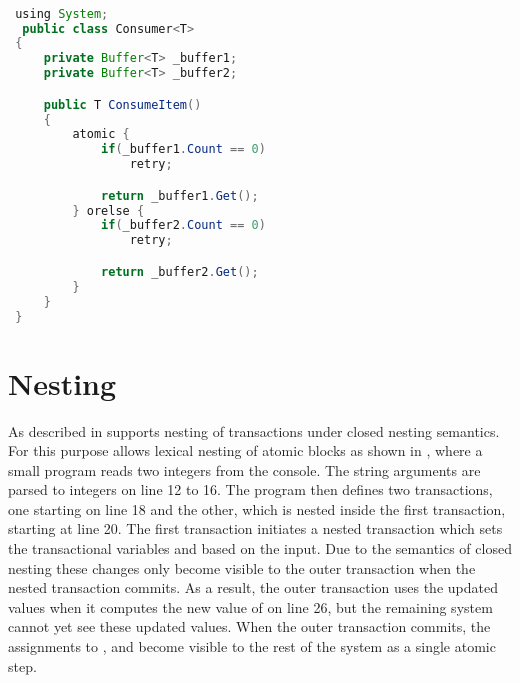 \begin{lstlisting}[label=lst:stm_atomic_syntax_orelse,
 caption={OrElse Syntax},
 language=Java, 
 showspaces=false,
 showtabs=false,
 breaklines=true,
 showstringspaces=false,
 breakatwhitespace=true,
 commentstyle=\color{greencomments},
 keywordstyle=\color{bluekeywords},
 stringstyle=\color{redstrings},
 morekeywords={atomic, retry, orelse, var, get, set, using}]  % Start your code-block

 using System;
  public class Consumer<T>
 {
     private Buffer<T> _buffer1;
     private Buffer<T> _buffer2;

     public T ConsumeItem()
     {
         atomic {
             if(_buffer1.Count == 0)
                 retry;

             return _buffer1.Get();
         } orelse {
             if(_buffer2.Count == 0)
                 retry;

             return _buffer2.Get();
         }
     }
 }
\end{lstlisting}

\section{Nesting}\label{sec:nesting_design}
As described in  \stmnamesp supports nesting of transactions under closed nesting semantics. For this purpose \stmnamesp allows lexical nesting of atomic blocks as shown in , where a small program reads two integers from the console. The string arguments are parsed to integers on line 12 to 16. The program then defines two transactions, one starting on line 18 and the other, which is nested inside the first transaction, starting at line 20. The first transaction initiates a nested transaction which sets the transactional variables  and  based on the input. Due to the semantics of closed nesting these changes only become visible to the outer transaction when the nested transaction commits. As a result, the outer transaction uses the updated values when it computes the new value of  on line 26, but the remaining system cannot yet see these updated values. When the outer transaction commits, the assignments to ,  and  become visible to the rest of the system as a single atomic step.

